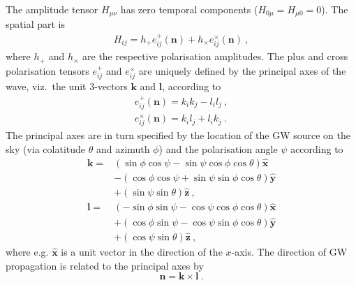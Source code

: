 \documentclass[fleqn,usenatbib,useAMS]{mnras}
\begin{document}
The amplitude tensor $H_{\mu \nu}$ has zero temporal components ($H_{0 \mu} = H_{\mu 0} = 0$). The spatial part is
\begin{align}
	H_{ij} = h_+ e_{ij}^+(\boldsymbol{n}) + h_{\times} e_{ij}^{\times}(\boldsymbol{n}) \ , \label{eq:hij}
\end{align}
where $h_{+}$ and $h_{\times}$ are the respective polarisation amplitudes. The plus and cross polarisation tensors $e_{ij}^{+}$ and $e_{ij}^{\times}$ are uniquely defined by the principal axes of the wave, viz.\ the unit 3-vectors $\boldsymbol{k}$ and $\boldsymbol{l}$, according to
\begin{align}
	e_{i j}^{+}(\boldsymbol{n}) =k_i k_j-l_i l_j \ , \\
		e_{i j}^{\times}(\boldsymbol{n}) =k_i l_j+l_i k_j \ .
\end{align}
The principal axes are in turn specified by the location of the GW source on the sky (via colatitude $\theta$ and azimuth $\phi$) and the polarisation angle $\psi$ according to
\begin{align}
	\boldsymbol{k}  = &(\sin \phi \cos \psi-\sin \psi \cos \phi \cos \theta) \boldsymbol{\hat{x}} \nonumber \\
	& -(\cos \phi \cos \psi+\sin \psi \sin \phi \cos \theta) \boldsymbol{\hat{y}} \nonumber \\
	& +(\sin \psi \sin \theta) \boldsymbol{\hat{z}} \ , \\
	\boldsymbol{l} = &(-\sin \phi \sin \psi-\cos \psi \cos \phi \cos \theta) \boldsymbol{\hat{x}} \nonumber \\
	& +(\cos \phi \sin \psi-\cos \psi \sin \phi \cos \theta) \boldsymbol{\hat{y}}\nonumber  \\
	& +(\cos \psi \sin \theta) \boldsymbol{\hat{z}} \ ,
\end{align}
where e.g. $\boldsymbol{\hat{x}}$ is a unit vector in the direction of the $x$-axis. The direction of GW propagation is related to the principal axes by
\begin{equation}
	\boldsymbol{n} = \boldsymbol{k} \times \boldsymbol{l} \ . 
\end{equation}
\end{document}

